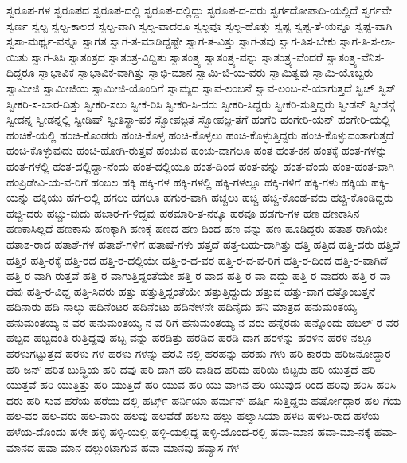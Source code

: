 {ಸ್ವರೂಪ-ಗಳ
ಸ್ವರೂಪದ
ಸ್ವರೂಪ-ದಲ್ಲಿ
ಸ್ವರೂಪ-ದಲ್ಲಿದ್ದು
ಸ್ವರೂಪ-ದ-ವರು
ಸ್ವರ್ಗದೋಪಾದಿ-ಯಲ್ಲಿದೆ
ಸ್ವರ್ಗವೇ
ಸ್ವರ್ಣ
ಸ್ವಲ್ಪ
ಸ್ವಲ್ಪ-ಕಾಲದ
ಸ್ವಲ್ಪ-ವಾಗಿ
ಸ್ವಲ್ಪ-ವಾದರೂ
ಸ್ವಲ್ಪವೂ
ಸ್ವಲ್ಪ-ಹೊತ್ತು
ಸ್ವಷ್ಟ
ಸ್ವಷ್ಟ-ತೆ-ಯನ್ನೂ
ಸ್ವಷ್ಟ-ವಾಗಿ
ಸ್ವಸಾ-ಮರ್ಥ್ಯ-ವನ್ನೂ
ಸ್ವಾಗತ
ಸ್ವಾಗ-ತ-ಮಾಡಿದ್ದಷ್ಟೇ
ಸ್ವಾಗ-ತ-ವಿತ್ತು
ಸ್ವಾಗ-ತವು
ಸ್ವಾಗ-ತಿಸ-ಬೇಕು
ಸ್ವಾಗ-ತಿ-ಸ-ಲಾ-ಯಿತು
ಸ್ವಾಗ-ತಿಸಿ
ಸ್ವಾತಂತ್ರದ
ಸ್ವಾತಂತ್ರ-ವಿದ್ದಿತು
ಸ್ವಾತಂತ್ರ್ಯ
ಸ್ವಾತಂತ್ರ್ಯ-ವನ್ನು
ಸ್ವಾತಂತ್ರ್ಯ-ವೆಂದರೆ
ಸ್ವಾತಂತ್ರ್ಯ-ವೆನಿಸ-ದಿದ್ದರೂ
ಸ್ವಾಭಾವಿಕ
ಸ್ವಾಭಾವಿಕ-ವಾಗಿತ್ತು
ಸ್ವಾಭಿ-ಮಾನ
ಸ್ವಾಮಿ-ಜಿ-ಯ-ವರು
ಸ್ವಾಮಿತ್ವವು
ಸ್ವಾಮಿ-ಯೊಬ್ಬರು
ಸ್ವಾಮೀಜಿ
ಸ್ವಾಮೀಜಿಯ
ಸ್ವಾಮೀಜಿ-ಯೊಂದಿಗೆ
ಸ್ವಾಮ್ಯದ
ಸ್ವಾವ-ಲಂಬನೆ
ಸ್ವಾವ-ಲಂಬ-ನೆ-ಯಾಗುತ್ತದೆ
ಸ್ವಿಚ್
ಸ್ವಿಸ್
ಸ್ವೀಕರಿ-ಸ-ಬಾರ-ದಿತ್ತು
ಸ್ವೀಕರಿ-ಸಲು
ಸ್ವೀಕ-ರಿಸಿ
ಸ್ವೀಕರಿ-ಸಿ-ದರು
ಸ್ವೀಕರಿ-ಸಿದ್ದರು
ಸ್ವೀಕರಿ-ಸುತ್ತಿದ್ದರು
ಸ್ವೀಡನ್
ಸ್ವೀಡನ್ಗೆ
ಸ್ವೀಡನ್ನ
ಸ್ವೀಡನ್ನಲ್ಲಿ
ಸ್ವೀಡಿಷ್
ಸ್ವೀತಿಸ್ಥಾ-ಪಕ
ಸ್ವೋಪಜ್ಞತೆ
ಸ್ವೋಪಜ್ಞ-ತೆಗೆ
ಹಂಗೆರಿ
ಹಂಗೇರಿ-ಯನ್
ಹಂಗೇರಿ-ಯಲ್ಲಿ
ಹಂಚಿಕೆ-ಯಲ್ಲಿ
ಹಂಚಿ-ಕೊಂಡರು
ಹಂಚಿ-ಕೊಳ್ಳ
ಹಂಚಿ-ಕೊಳ್ಳಲು
ಹಂಚಿ-ಕೊಳ್ಳುತ್ತಿದ್ದರು
ಹಂಚಿ-ಕೊಳ್ಳುವಂತಾಗುತ್ತದೆ
ಹಂಚಿ-ಕೊಳ್ಳುವುದು
ಹಂಚಿ-ಹೋಗಿ-ರುತ್ತವೆ
ಹಂಚುವ
ಹಂಚು-ವಾಗಲೂ
ಹಂತ
ಹಂತ-ಕನ
ಹಂತಕ್ಕೆ
ಹಂತ-ಗಳನ್ನು
ಹಂತ-ಗಳಲ್ಲಿ
ಹಂತ-ದಲ್ಲಿದ್ದಾ-ನೆಂದು
ಹಂತ-ದಲ್ಲಿಯೂ
ಹಂತ-ದಿಂದ
ಹಂತ-ವನ್ನು
ಹಂತ-ವೆಂದು
ಹಂತ-ಹಂತ-ವಾಗಿ
ಹಂಪ್ರಿಡೇವಿ-ಯ-ವ-ರಿಗೆ
ಹಂಬಲ
ಹಕ್ಕಿ
ಹಕ್ಕಿ-ಗಳ
ಹಕ್ಕಿ-ಗಳಲ್ಲಿ
ಹಕ್ಕಿ-ಗಳಲ್ಲೂ
ಹಕ್ಕಿ-ಗಳಿಗೆ
ಹಕ್ಕಿ-ಗಳು
ಹಕ್ಕಿಯ
ಹಕ್ಕಿ-ಯನ್ನು
ಹಕ್ಕಿಯು
ಹಗ-ಲಲ್ಲಿ
ಹಗಲು
ಹಗಲೂ
ಹಗುರ-ವಾಗಿ
ಹಚ್ಚಲು
ಹಚ್ಚಿ
ಹಚ್ಚಿ-ಕೊಂಡ-ವರು
ಹಚ್ಚಿ-ಕೊಂಡಿದ್ದರು
ಹಚ್ಚಿ-ದರು
ಹಚ್ಚು-ವುದು
ಹಜಾರ-ಗ-ಳಿದ್ದವು
ಹಠಮಾರಿ-ತ-ನಕ್ಕೂ
ಹಠವೂ
ಹಡಗು-ಗಳ
ಹಣ
ಹಣಕಾಸಿನ
ಹಣಕಾಸಿಲ್ಲದೆ
ಹಣಕಾಸು
ಹಣಕ್ಕಾಗಿ
ಹಣಕ್ಕೆ
ಹಣದ
ಹಣ-ದಿಂದ
ಹಣ-ವನ್ನು
ಹಣ-ಹೂಡಿದ್ದರು
ಹತಾಶ-ರಾಗಿಯೇ
ಹತಾಶ-ರಾದ
ಹತಾಶೆ-ಗಳ
ಹತಾಶೆ-ಗಳಿಗೆ
ಹತಾಷೆ-ಗಳು
ಹತ್ತದೆ
ಹತ್ತ-ಬಹು-ದಾಗಿತ್ತು
ಹತ್ತಿ
ಹತ್ತಿದ
ಹತ್ತಿ-ದರು
ಹತ್ತಿದೆ
ಹತ್ತಿರ
ಹತ್ತಿ-ರಕ್ಕೆ
ಹತ್ತಿ-ರದ
ಹತ್ತಿ-ರ-ದಲ್ಲಿಯೇ
ಹತ್ತಿ-ರ-ದ-ವರ
ಹತ್ತಿ-ರ-ದ-ವ-ರಿಗೆ
ಹತ್ತಿ-ರ-ದಿಂದ
ಹತ್ತಿ-ರ-ವಾಗಿದೆ
ಹತ್ತಿ-ರ-ವಾಗಿ-ರುತ್ತವೆ
ಹತ್ತಿ-ರ-ವಾಗುತ್ತಿದ್ದಂತೆಯೇ
ಹತ್ತಿ-ರ-ವಾದ
ಹತ್ತಿ-ರ-ವಾ-ದದ್ದು
ಹತ್ತಿ-ರ-ವಾದರು
ಹತ್ತಿ-ರ-ವಾ-ದೆವು
ಹತ್ತಿ-ರ-ವಿದ್ದ
ಹತ್ತಿ-ಸಿದರು
ಹತ್ತು
ಹತ್ತುತ್ತಿದ್ದಂತೆಯೇ
ಹತ್ತುತ್ತಿದ್ದುದು
ಹತ್ತುವ
ಹತ್ತು-ವಾಗ
ಹತ್ತೊಂಬತ್ತನೆ
ಹದಿನಾರು
ಹದಿ-ನಾಲ್ಕು
ಹದಿನೆಂಟರ
ಹದಿನೆಂಟು
ಹದಿನೇಳನೇ
ಹದಿನೈದು
ಹನಿ-ಮಾತ್ರದ
ಹನುಮಂತಯ್ಯ
ಹನುಮಂತಯ್ಯ-ನ-ವರ
ಹನುಮಂತಯ್ಯ-ನ-ವ-ರಿಗೆ
ಹನುಮಂತಯ್ಯ-ನ-ವರು
ಹನ್ನೆರಡು
ಹನ್ನೊಂದು
ಹಬಲ್-ರ-ವರ
ಹಬ್ಬದ
ಹಬ್ಬದಂತಿ-ರುತ್ತಿದ್ದವು
ಹಬ್ಬ-ವನ್ನು
ಹರಡಿತ್ತು
ಹರಡಿದ
ಹರಡಿ-ದಾಗ
ಹರಳನ್ನು
ಹರಳಿನ
ಹರಳಿ-ನಲ್ಲೂ
ಹರಳುಗಟ್ಟುತ್ತದೆ
ಹರಳು-ಗಳ
ಹರಳು-ಗಳನ್ನು
ಹರವಿ-ನಲ್ಲಿ
ಹರಹನ್ನು
ಹರಹು-ಗಳು
ಹರಿ-ಕಾರರು
ಹರಿಜನೋದ್ಧಾರ
ಹರಿ-ಜನ್
ಹರಿತ-ಬುದ್ಧಿಯ
ಹರಿ-ದವು
ಹರಿ-ದಾಗ
ಹರಿ-ದಾಡಿದ
ಹರಿದು
ಹರಿಯಿ-ಬಿಟ್ಟರು
ಹರಿ-ಯುತ್ತದೆ
ಹರಿ-ಯುತ್ತವೆ
ಹರಿ-ಯುತ್ತಿತ್ತು
ಹರಿ-ಯುತ್ತಿದೆ
ಹರಿ-ಯುವ
ಹರಿ-ಯು-ವಾಗಿನ
ಹರಿ-ಯುವುದ-ರಿಂದ
ಹರಿವು
ಹರಿಸಿ
ಹರಿಸಿ-ದರು
ಹರಿ-ಸುವ
ಹರೆಯ
ಹರೆಯ-ದಲ್ಲಿ
ಹರ್ಟ್ಸ್
ಹರ್ನಿಯಾ
ಹರ್ಮನ್
ಹರ್ಷಿ-ಸುತ್ತಿದ್ದರು
ಹರ್ಷೋದ್ಗಾರ
ಹಲ-ಗೆಯ
ಹಲ-ವರ
ಹಲ-ವರು
ಹಲ-ವಾರು
ಹಲವು
ಹಲವೆಡೆ
ಹಲಸು
ಹಲ್ಲು
ಹಲ್ವಾಸಿಯಾ
ಹಳದಿ
ಹಳಬ-ರಾದ
ಹಳೆಯ
ಹಳೆಯ-ದೊಂದು
ಹಳೇ
ಹಳ್ಳಿ
ಹಳ್ಳಿ-ಯಲ್ಲಿ
ಹಳ್ಳಿ-ಯಲ್ಲಿದ್ದ
ಹಳ್ಳಿ-ಯೊಂದ-ರಲ್ಲಿ
ಹವಾ-ಮಾನ
ಹವಾ-ಮಾ-ನಕ್ಕೆ
ಹವಾ-ಮಾನದ
ಹವಾ-ಮಾನ-ದಲ್ಲುಂಟಾಗುವ
ಹವಾ-ಮಾನವು
ಹವ್ಯಾಸ-ಗಳ
}
